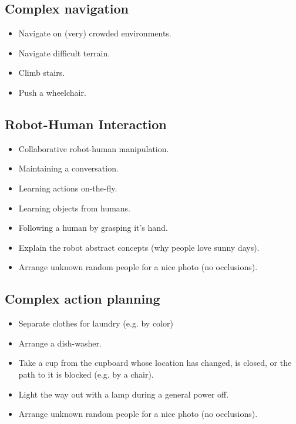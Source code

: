 \subsection{Complex navigation}
\begin{itemize}
	\item Navigate on (very) crowded environments.
	\item Navigate difficult terrain.
	\item Climb stairs.
	\item Push a wheelchair.
\end{itemize}

\subsection{Robot-Human Interaction}
\begin{itemize}
	\item Collaborative robot-human manipulation.
	\item Maintaining a conversation.
	\item Learning actions on-the-fly.
	\item Learning objects from humans.
	\item Following a human by grasping it's hand.
	\item Explain the robot abstract concepts (why people love sunny days).
	\item Arrange unknown random people for a nice photo (no occlusions).
\end{itemize}

\subsection{Complex action planning} 
\begin{itemize}
	\item Separate clothes for laundry (e.g. by color)
	\item Arrange a dish-washer.
	\item Take a cup from the cupboard whose location has changed, is closed, or the path to it is blocked (e.g. by a chair).
	\item Light the way out with a lamp during a general power off.
	\item Arrange unknown random people for a nice photo (no occlusions).
\end{itemize}
